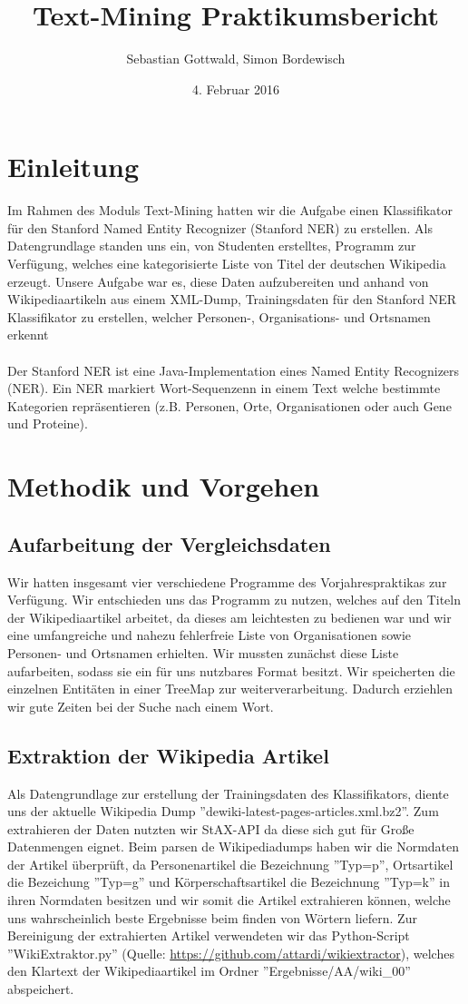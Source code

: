 \documentclass[a4paper]{article}
\author{Sebastian Gottwald, Simon Bordewisch}
\title{Text-Mining Praktikumsbericht}
\date{4. Februar 2016}
\begin{document}
\maketitle
\newpage
\section{Einleitung}
Im Rahmen des Moduls Text-Mining hatten wir die Aufgabe einen Klassifikator für den Stanford Named Entity Recognizer (Stanford NER) zu erstellen. Als Datengrundlage standen uns ein, von Studenten erstelltes, Programm zur Verfügung, welches eine kategorisierte Liste von Titel der deutschen Wikipedia erzeugt. Unsere Aufgabe war es, diese Daten aufzubereiten und anhand von Wikipediaartikeln aus einem XML-Dump, Trainingsdaten für den Stanford NER Klassifikator zu erstellen, welcher Personen-, Organisations- und Ortsnamen erkennt
\\\\
Der Stanford NER ist eine Java-Implementation eines Named Entity Recognizers (NER). Ein NER markiert Wort-Sequenzenn in einem Text welche bestimmte Kategorien repräsentieren (z.B. Personen, Orte, Organisationen oder auch Gene und Proteine).
\section{Methodik und Vorgehen}
\subsection{Aufarbeitung der Vergleichsdaten}
Wir hatten insgesamt vier verschiedene Programme des Vorjahrespraktikas zur Verfügung. Wir entschieden uns das Programm zu nutzen, welches auf den Titeln der Wikipediaartikel arbeitet, da dieses am leichtesten zu bedienen war und wir eine umfangreiche und nahezu fehlerfreie Liste von Organisationen sowie Personen- und Ortsnamen erhielten. Wir mussten zunächst diese Liste aufarbeiten, sodass sie ein für uns nutzbares Format besitzt. Wir speicherten die einzelnen Entitäten in einer TreeMap zur weiterverarbeitung. Dadurch erziehlen wir gute Zeiten bei der Suche nach einem Wort.
\subsection{Extraktion der Wikipedia Artikel}
Als Datengrundlage zur erstellung der Trainingsdaten des Klassifikators, diente uns der aktuelle Wikipedia Dump ''dewiki-latest-pages-articles.xml.bz2''. Zum extrahieren der Daten nutzten wir StAX-API da diese sich gut für Große Datenmengen eignet. Beim parsen de Wikipediadumps haben wir die Normdaten der Artikel überprüft, da Personenartikel die Bezeichnung ''Typ=p'', Ortsartikel die Bezeichung ''Typ=g'' und Körperschaftsartikel die Bezeichnung ''Typ=k'' in ihren Normdaten besitzen und wir somit die Artikel extrahieren können, welche uns wahrscheinlich beste Ergebnisse beim finden von Wörtern liefern. Zur Bereinigung der extrahierten Artikel verwendeten wir das Python-Script ''WikiExtraktor.py'' (Quelle: \url{https://github.com/attardi/wikiextractor}), welches den Klartext der Wikipediaartikel im Ordner ''Ergebnisse/AA/wiki\_00'' abspeichert.
\end{document}
